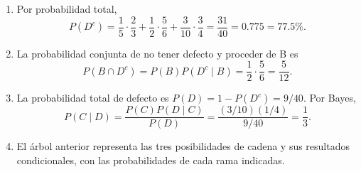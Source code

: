 \documentclass[12pt]{article}
\begin{document}
\begin{enumerate}
    \item Por probabilidad total,
    \[
    P(D^c)=\frac{1}{5}\cdot\frac{2}{3}
    +\frac{1}{2}\cdot\frac{5}{6}
    +\frac{3}{10}\cdot\frac{3}{4}
    =\frac{31}{40}=0.775=77.5\%.
    \]
    \item La probabilidad conjunta de no tener defecto y proceder de B es
    \[
    P(B\cap D^c)=P(B)P(D^c\mid B)
    =\frac{1}{2}\cdot\frac{5}{6}=\frac{5}{12}.
    \]
    \item La probabilidad total de defecto es $P(D)=1-P(D^c)=9/40$. Por Bayes,
    \[
    P(C\mid D)=\frac{P(C)P(D\mid C)}{P(D)}
    =\frac{(3/10)(1/4)}{9/40}=\frac{1}{3}.
    \]
    \item El árbol anterior representa las tres posibilidades de cadena y sus resultados condicionales, con las probabilidades de cada rama indicadas.
\end{enumerate}
\end{document}
